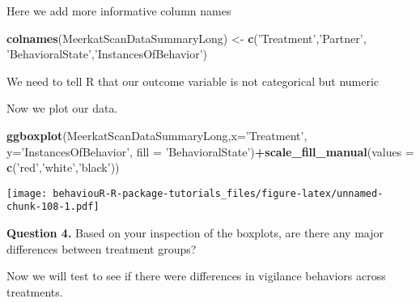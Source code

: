 \documentclass[]{book}
\newenvironment{Shaded}{\begin{snugshade}}{\end{snugshade}}
\newcommand{\DataTypeTok}[1]{\textcolor[rgb]{0.13,0.29,0.53}{#1}}
\newcommand{\KeywordTok}[1]{\textcolor[rgb]{0.13,0.29,0.53}{\textbf{#1}}}
\newcommand{\NormalTok}[1]{#1}
\newcommand{\OperatorTok}[1]{\textcolor[rgb]{0.81,0.36,0.00}{\textbf{#1}}}
\newcommand{\StringTok}[1]{\textcolor[rgb]{0.31,0.60,0.02}{#1}}
\begin{document}
Here we add more informative column names

\begin{Shaded}
\begin{Highlighting}[]
\KeywordTok{colnames}\NormalTok{(MeerkatScanDataSummaryLong) <-}\StringTok{ }\KeywordTok{c}\NormalTok{(}\StringTok{'Treatment'}\NormalTok{,}\StringTok{'Partner'}\NormalTok{,}
                                          \StringTok{'BehavioralState'}\NormalTok{,}\StringTok{'InstancesOfBehavior'}\NormalTok{)}
\end{Highlighting}
\end{Shaded}

We need to tell R that our outcome variable is not categorical but numeric

\begin{Shaded}
\end{Shaded}

Now we plot our data.

\begin{Shaded}
\begin{Highlighting}[]
\KeywordTok{ggboxplot}\NormalTok{(MeerkatScanDataSummaryLong,}\DataTypeTok{x=}\StringTok{'Treatment'}\NormalTok{,}
          \DataTypeTok{y=}\StringTok{'InstancesOfBehavior'}\NormalTok{, }\DataTypeTok{fill =} \StringTok{'BehavioralState'}\NormalTok{)}\OperatorTok{+}\KeywordTok{scale_fill_manual}\NormalTok{(}\DataTypeTok{values =} \KeywordTok{c}\NormalTok{(}\StringTok{'red'}\NormalTok{,}\StringTok{'white'}\NormalTok{,}\StringTok{'black'}\NormalTok{))}
\end{Highlighting}
\end{Shaded}

\texttt{[image: behaviouR-R-package-tutorials\_files/figure-latex/unnamed-chunk-108-1.pdf]}

\textbf{Question 4.} Based on your inspection of the boxplots, are there any major differences between treatment groups?

Now we will test to see if there were differences in vigilance behaviors across treatments.
\end{document}
